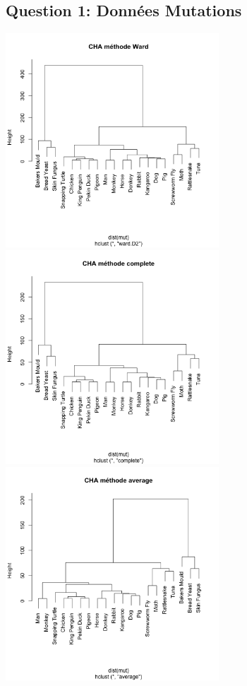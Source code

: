 \documentclass[10pt]{article}
\begin{document}
	\subsection{Question 1:  Données Mutations}
	\includegraphics[height = 8cm, width = 8cm]{Figures/HClust/hclust_Mutations_ward.png}
	\includegraphics[height = 8cm, width = 8cm]{Figures/HClust/hclust_Mutations_cplt.png}\\
	\includegraphics[height = 8cm, width = 8cm]{Figures/HClust/hclust_Mutations_avg.png}
\end{document}
